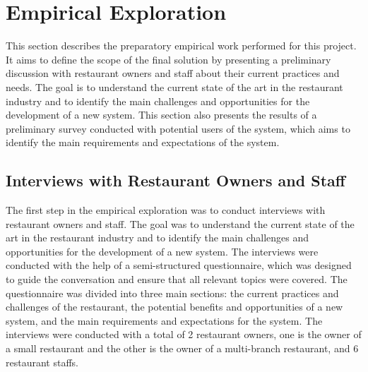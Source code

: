 \section{Empirical Exploration}
This section describes the preparatory empirical work performed for this project. It aims to define the scope of the final solution by presenting a preliminary discussion with restaurant owners and staff about their current practices and needs. The goal is to understand the current state of the art in the restaurant industry and to identify the main challenges and opportunities for the development of a new system. This section also presents the results of a preliminary survey conducted with potential users of the system, which aims to identify the main requirements and expectations of the system.

\subsection{Interviews with Restaurant Owners and Staff}
The first step in the empirical exploration was to conduct interviews with restaurant owners and staff. The goal was to understand the current state of the art in the restaurant industry and to identify the main challenges and opportunities for the development of a new system. The interviews were conducted with the help of a semi-structured questionnaire, which was designed to guide the conversation and ensure that all relevant topics were covered. The questionnaire was divided into three main sections: the current practices and challenges of the restaurant, the potential benefits and opportunities of a new system, and the main requirements and expectations for the system. The interviews were conducted with a total of 2 restaurant owners, one is the owner of a small restaurant and the other is the owner of a multi-branch restaurant, and 6 restaurant staffs.


